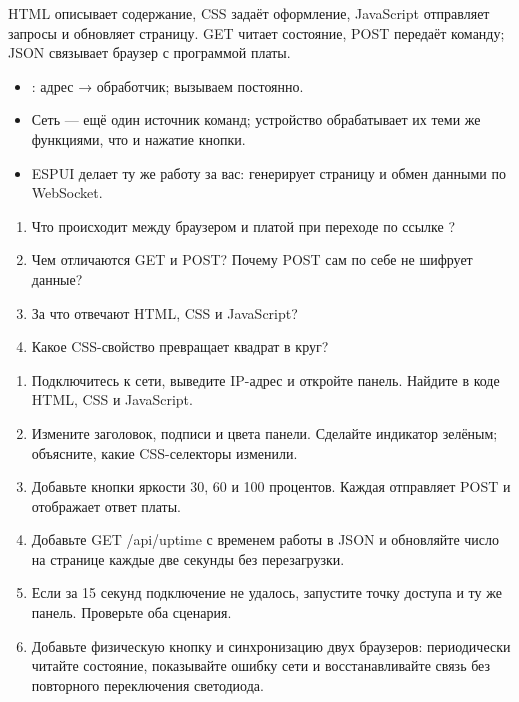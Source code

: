 \begin{summary}
HTML описывает содержание, CSS задаёт оформление, JavaScript отправляет запросы и обновляет страницу.
GET читает состояние, POST передаёт команду; JSON связывает браузер с программой платы.

\begin{itemize}[leftmargin=*]
  \item {}: адрес → обработчик;  вызываем постоянно.
  \item Сеть --- ещё один источник команд; устройство обрабатывает их теми же функциями, что и нажатие кнопки.
  \item ESPUI делает ту же работу за вас: генерирует страницу и обмен данными по WebSocket.
\end{itemize}
\end{summary}

\begin{selfcheck}
\begin{enumerate}
  \item Что происходит между браузером и платой при переходе по ссылке ?
  \item Чем отличаются GET и POST? Почему POST сам по себе не шифрует данные?
  \item За что отвечают HTML, CSS и JavaScript?
  \item Какое CSS-свойство превращает квадрат в круг?
\end{enumerate}
\end{selfcheck}

\begin{tasks}
\begin{enumerate}
\item {} Подключитесь к сети, выведите IP-адрес и откройте панель. Найдите в коде HTML, CSS и JavaScript.
\item {} Измените заголовок, подписи и цвета панели. Сделайте индикатор зелёным; объясните, какие CSS-селекторы изменили.
\item {} Добавьте кнопки яркости 30, 60 и 100 процентов. Каждая отправляет POST и отображает ответ платы.
\item {} Добавьте GET /api/uptime с временем работы в JSON и обновляйте число на странице каждые две секунды без перезагрузки.
\item {} Если за 15 секунд подключение не удалось, запустите точку доступа и ту же панель. Проверьте оба сценария.
\item {} Добавьте физическую кнопку и синхронизацию двух браузеров: периодически читайте состояние, показывайте ошибку сети и восстанавливайте связь без повторного переключения светодиода.
\end{enumerate}
\end{tasks}
